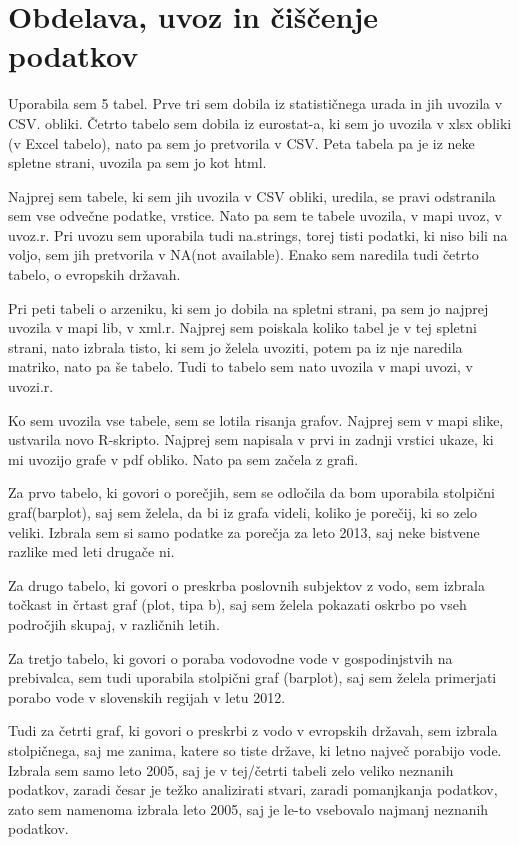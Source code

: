 \documentclass[11pt,a4paper]{article}
\begin{document}
\newpage
\section{Obdelava, uvoz in čiščenje podatkov}
Uporabila sem 5 tabel.
Prve tri sem dobila iz statističnega urada in jih uvozila v CSV. obliki.
Četrto tabelo sem dobila iz eurostat-a, ki sem jo uvozila v xlsx obliki (v Excel tabelo), nato pa sem jo pretvorila v CSV. Peta tabela pa je iz neke spletne strani, uvozila pa sem jo kot html.

Najprej sem tabele, ki sem jih uvozila v CSV obliki, uredila, se pravi odstranila sem vse odvečne podatke, vrstice. Nato pa sem te tabele uvozila, v mapi uvoz, v uvoz.r. Pri uvozu sem uporabila tudi na.strings, torej tisti podatki, ki niso bili na voljo, sem jih pretvorila v NA(not available). Enako sem naredila tudi četrto tabelo, o evropskih državah.

Pri peti tabeli o arzeniku, ki sem jo dobila na spletni strani, pa sem jo najprej uvozila v mapi lib, v xml.r. Najprej sem poiskala koliko tabel je v tej spletni strani, nato izbrala tisto, ki sem jo želela uvoziti, potem pa iz nje naredila matriko, nato pa še tabelo. Tudi to tabelo sem nato uvozila v mapi uvozi, v uvozi.r.

Ko sem uvozila vse tabele, sem se lotila risanja grafov. Najprej sem v mapi slike, ustvarila novo R-skripto. Najprej sem napisala v prvi in zadnji vrstici ukaze, ki mi uvozijo grafe v pdf obliko. Nato pa sem začela z grafi. 

Za prvo tabelo, ki govori o porečjih, sem se odločila da bom uporabila stolpični graf(barplot), saj sem želela, da bi iz grafa videli, koliko je porečij, ki so zelo veliki. Izbrala sem si samo podatke za porečja za leto 2013, saj neke bistvene razlike med leti drugače ni. 

Za drugo tabelo, ki govori o preskrba poslovnih subjektov z vodo, sem izbrala točkast in črtast graf (plot, tipa b), saj sem želela pokazati oskrbo po vseh področjih skupaj, v različnih letih. 

Za tretjo tabelo, ki govori o poraba vodovodne vode v gospodinjstvih na prebivalca, sem tudi uporabila stolpični graf (barplot), saj sem želela primerjati porabo vode v slovenskih regijah v letu 2012. 

Tudi za četrti graf, ki govori o preskrbi z vodo v evropskih državah, sem izbrala stolpičnega, saj me zanima, katere so tiste države, ki letno največ porabijo vode. Izbrala sem samo leto 2005, saj je v tej/četrti tabeli zelo veliko neznanih podatkov, zaradi česar je težko analizirati stvari, zaradi pomanjkanja podatkov, zato sem namenoma izbrala leto 2005, saj je le-to vsebovalo najmanj neznanih podatkov.
\end{document}
